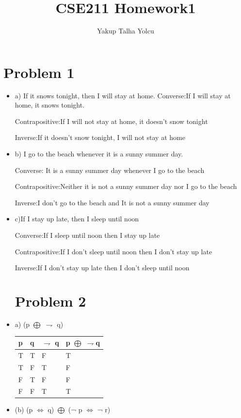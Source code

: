 \documentclass{article}
\title{CSE211 Homework1}
\author{Yakup Talha Yolcu }
\begin{document}
\maketitle

\section{Problem 1}
\begin{itemize}
    \item a) If it snows tonight, then I will stay at home.
    \newline
    Converse:If I will stay at home, it snows tonight.
    
    Contrapositive:If I will not stay at home, it doesn't snow tonight
    
    Inverse:If it doesn't snow tonight, I will not stay at home
    \newline
    
    \item b) I go to the beach whenever it is a sunny summer day.
    
    Converse: It is a sunny summer day whenever I go to the beach
    
    Contrapositive:Neither it is not a sunny summer day nor I go to the beach 
    
    Inverse:I don't go to the beach and It is not a sunny summer day
    \newline
    
    \item c)If I stay up late, then I sleep until noon
    
    Converse:If I sleep until noon then I stay up late
    
    Contrapositive:If I don't sleep until noon then I don't stay up late
    
    Inverse:If I don't stay up late then I don't sleep until noon
    
 
\section{Problem 2}
    \item a) (p $\bigoplus$ $\rightharpoondown$ q)
    \begin{table}[]
    \begin{tabular}{|l|l|l|l|}
    \hline
    p & q & $\rightharpoondown$ q & p $\bigoplus$ $\rightharpoondown$q \\ \hline
    T & T & F   & T              \\ \hline
    T & F & T   & F              \\ \hline
    F & T & F   & F              \\ \hline
    F & F & T   & T              \\ \hline
    \end{tabular}
    \end{table}
   \newline
   \newline\newline
  
\item (b) (p $\Leftrightarrow$ q) $\bigoplus$ (¬ p $\Leftrightarrow$ ¬ r)
\end{itemize}
\end{document}
